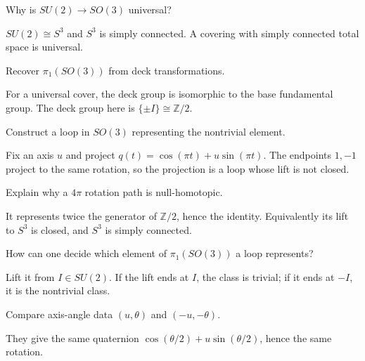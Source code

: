 \begin{problem}\label{prob:viii13-08}
Why is \(SU(2)\to SO(3)\) universal?
\end{problem}
\begin{solution}
\(SU(2)\cong S^3\) and \(S^3\) is simply connected. A covering with simply connected total space is universal.
\end{solution}

\begin{problem}\label{prob:viii13-09}
Recover \(\pi_1(SO(3))\) from deck transformations.
\end{problem}
\begin{solution}
For a universal cover, the deck group is isomorphic to the base fundamental group. The deck group here is \(\{\pm I\}\cong\mathbb Z/2\).
\end{solution}

\begin{problem}\label{prob:viii13-10}
Construct a loop in \(SO(3)\) representing the nontrivial element.
\end{problem}
\begin{solution}
Fix an axis \(u\) and project \(q(t)=\cos(\pi t)+u\sin(\pi t)\). The endpoints \(1,-1\) project to the same rotation, so the projection is a loop whose lift is not closed.
\end{solution}

\begin{problem}\label{prob:viii13-11}
Explain why a \(4\pi\) rotation path is null-homotopic.
\end{problem}
\begin{solution}
It represents twice the generator of \(\mathbb Z/2\), hence the identity. Equivalently its lift to \(S^3\) is closed, and \(S^3\) is simply connected.
\end{solution}

\begin{problem}\label{prob:viii13-12}
How can one decide which element of \(\pi_1(SO(3))\) a loop represents?
\end{problem}
\begin{solution}
Lift it from \(I\in SU(2)\). If the lift ends at \(I\), the class is trivial; if it ends at \(-I\), it is the nontrivial class.
\end{solution}

\begin{problem}\label{prob:viii13-13}
Compare axis-angle data \((u,\theta)\) and \((-u,-\theta)\).
\end{problem}
\begin{solution}
They give the same quaternion \(\cos(\theta/2)+u\sin(\theta/2)\), hence the same rotation.
\end{solution}

